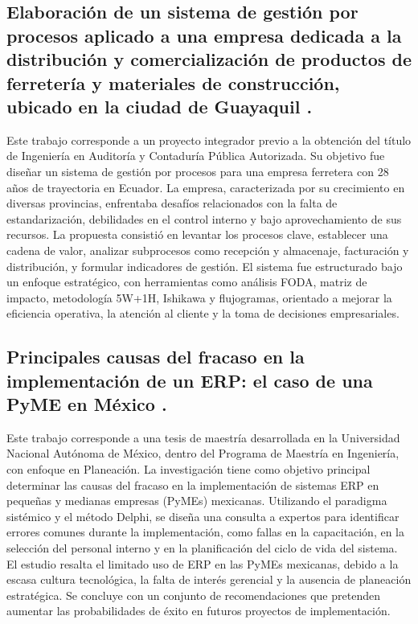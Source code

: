 \subsection{Elaboración de un sistema de gestión por procesos aplicado a una empresa dedicada a la distribución y comercialización de productos de ferretería y materiales de construcción, ubicado en la ciudad de Guayaquil \cite{Vargas2018}.}

Este trabajo corresponde a un proyecto integrador previo a la obtención del título de Ingeniería en Auditoría y Contaduría Pública Autorizada. Su objetivo fue diseñar un sistema de gestión por procesos para una empresa ferretera con 28 años de trayectoria en Ecuador. La empresa, caracterizada por su crecimiento en diversas provincias, enfrentaba desafíos relacionados con la falta de estandarización, debilidades en el control interno y bajo aprovechamiento de sus recursos. La propuesta consistió en levantar los procesos clave, establecer una cadena de valor, analizar subprocesos como recepción y almacenaje, facturación y distribución, y formular indicadores de gestión. El sistema fue estructurado bajo un enfoque estratégico, con herramientas como análisis FODA, matriz de impacto, metodología 5W+1H, Ishikawa y flujogramas, orientado a mejorar la eficiencia operativa, la atención al cliente y la toma de decisiones empresariales.

\subsection{Principales causas del fracaso en la implementación de un ERP: el caso de una PyME en México \cite{Delgado2015}.}

Este trabajo corresponde a una tesis de maestría desarrollada en la Universidad Nacional Autónoma de México, dentro del Programa de Maestría en Ingeniería, con enfoque en Planeación. La investigación tiene como objetivo principal determinar las causas del fracaso en la implementación de sistemas ERP en pequeñas y medianas empresas (PyMEs) mexicanas. Utilizando el paradigma sistémico y el método Delphi, se diseña una consulta a expertos para identificar errores comunes durante la implementación, como fallas en la capacitación, en la selección del personal interno y en la planificación del ciclo de vida del sistema. El estudio resalta el limitado uso de ERP en las PyMEs mexicanas, debido a la escasa cultura tecnológica, la falta de interés gerencial y la ausencia de planeación estratégica. Se concluye con un conjunto de recomendaciones que pretenden aumentar las probabilidades de éxito en futuros proyectos de implementación.


